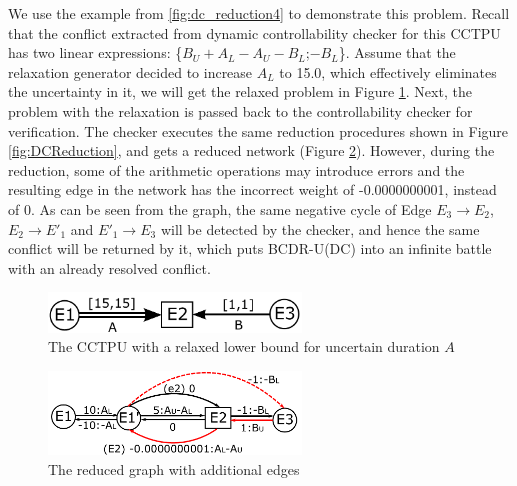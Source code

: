 \documentclass[jair,twoside,11pt,theapa]{article}
\begin{document}
We use the example from \ref{fig:dc_reduction4} to demonstrate this problem.
Recall that the conflict extracted from dynamic controllability checker for this
CCTPU has two linear expressions: \{$B_U+A_L-A_U-B_L$;$-B_L$\}. Assume that the
relaxation generator decided to increase $A_L$ to 15.0, which effectively
eliminates the uncertainty in it, we will get the relaxed problem in Figure
\ref{fig:num_issue_1}. Next, the problem with the relaxation is passed back to
the controllability checker for verification. The checker executes the same
reduction procedures shown in Figure \ref{fig:DCReduction}, and gets a reduced
network (Figure \ref{fig:num_issue_2}). However, during the reduction, some of
the arithmetic operations may introduce errors and the resulting edge in the
network has the incorrect weight of -0.0000000001, instead of 0. As can be seen
from the graph, the same negative cycle of Edge $E_3\rightarrow
E_2$,$E_2\rightarrow E'_1$ and $E'_1\rightarrow E_3$ will be detected by the
checker, and hence the same conflict will be returned by it, which puts BCDR-U(DC)
into an infinite battle with an already resolved conflict.


\begin{figure}[htb]
	\centering
	\includegraphics[width=0.6\textwidth]{figures/numerical_issues/num_1.pdf}
	\caption{The CCTPU with a relaxed lower bound for uncertain duration $A$}
	\label{fig:num_issue_1}
\end{figure}


\begin{figure}[htb]
	\centering
	\includegraphics[width=0.6\textwidth]{figures/numerical_issues/num_2.pdf}
	\caption{The reduced graph with additional edges}
	\label{fig:num_issue_2}
\end{figure}
\end{document}
